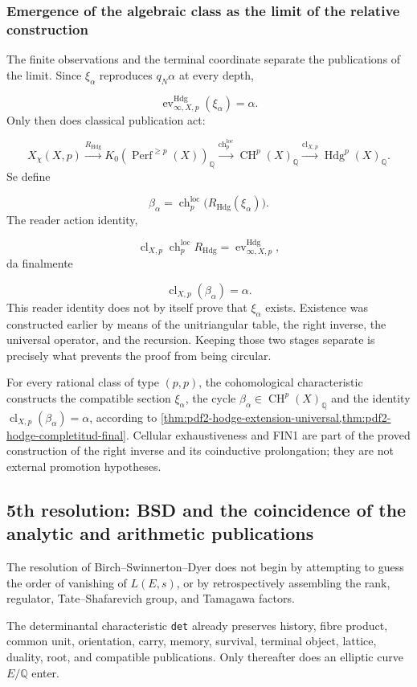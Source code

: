 \subsubsection{Emergence of the algebraic class as the limit of the relative construction}
The finite observations and the terminal coordinate separate the publications of the limit. Since \(\xi_\alpha\) reproduces \(q_N\alpha\) at every depth,\par
\[
\operatorname{ev}_{\infty,X,p}^{\mathrm{Hdg}}
(\xi_\alpha)
=
\alpha.
\]
Only then does classical publication act:\par
\[
X_\chi(X,p)
\xrightarrow{R_{\mathrm{Hdg}}}
K_0\!\left(
\operatorname{Perf}^{\ge p}(X)
\right)_{\mathbb Q}
\xrightarrow{\operatorname{ch}^{\mathrm{loc}}_p}
\operatorname{CH}^{p}(X)_{\mathbb Q}
\xrightarrow{\operatorname{cl}_{X,p}}
\operatorname{Hdg}^{p}(X)_{\mathbb Q}.
\]
Se define\par
\[
\beta_\alpha
=
\operatorname{ch}^{\mathrm{loc}}_p
\bigl(R_{\mathrm{Hdg}}(\xi_\alpha)\bigr).
\]
The reader action identity,\par
\[
\operatorname{cl}_{X,p}
\operatorname{ch}^{\mathrm{loc}}_p
R_{\mathrm{Hdg}}
=
\operatorname{ev}_{\infty,X,p}^{\mathrm{Hdg}},
\]
da finalmente\par
\[
\operatorname{cl}_{X,p}(\beta_\alpha)
=
\alpha.
\]
This reader identity does not by itself prove that \(\xi_\alpha\) exists. Existence was constructed earlier by means of the unitriangular table, the right inverse, the universal operator, and the recursion. Keeping those two stages separate is precisely what prevents the proof from being circular.\par
For every rational class of type \((p,p)\), the cohomological characteristic constructs the compatible section \(\xi_\alpha\), the cycle \(\beta_\alpha\in\operatorname{CH}^p(X)_{\mathbb Q}\) and the identity \(\operatorname{cl}_{X,p}(\beta_\alpha)=\alpha\), according to \cref{thm:pdf2-hodge-extension-universal,thm:pdf2-hodge-completitud-final}. Cellular exhaustiveness and FIN1 are part of the proved construction of the right inverse and its coinductive prolongation; they are not external promotion hypotheses.\par
{}
\subsection{5th resolution: BSD and the coincidence of the analytic and arithmetic publications}
The resolution of Birch--Swinnerton--Dyer does not begin by attempting to guess the order of vanishing of \(L(E,s)\), or by retrospectively assembling the rank, regulator, Tate--Shafarevich group, and Tamagawa factors.\par
The determinantal characteristic \texttt{det} already preserves history, fibre product, common unit, orientation, carry, memory, survival, terminal object, lattice, duality, root, and compatible publications. Only thereafter does an elliptic curve \(E/\mathbb Q\) enter.\par
{}
